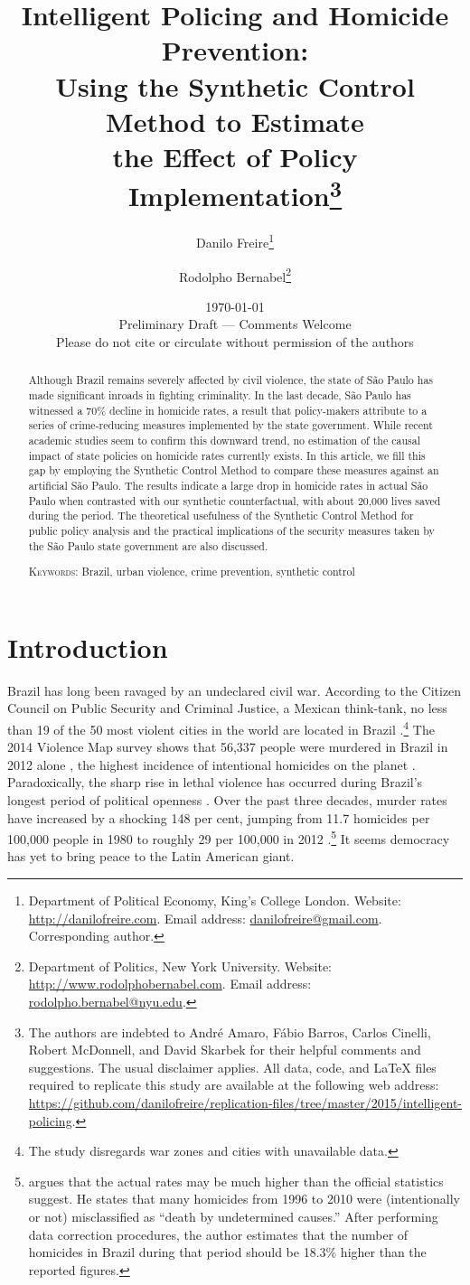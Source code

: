 \documentclass[a4paper,11pt]{article}
\title{Intelligent Policing and Homicide Prevention:\\ Using the Synthetic Control Method to Estimate\\ the Effect of Policy Implementation\thanks{The authors are indebted to Andr\'{e} Amaro, F\'{a}bio Barros, Carlos Cinelli, Robert McDonnell, and David Skarbek for their helpful comments and suggestions. The usual disclaimer applies. All data, code, and \LaTeX \hspace{.001cm} files required to replicate this study are available at the following web address: \href{https://github.com/danilofreire/replication-files/tree/master/2015/intelligent-policing}{https://github.com/danilofreire/replication-files/tree/master/2015/intelligent-policing}.}}
\author{
Danilo Freire\thanks{Department of Political Economy, King's College London. Website: \href{http://danilofreire.com}{http://danilofreire.com}. Email address: \href{mailto:danilofreire@gmail.com}{danilofreire@gmail.com}. Corresponding author.}
\and Rodolpho Bernabel\thanks{Department of Politics, New York University. Website: \href{http://www.rodolphobernabel.com}{http://www.rodolphobernabel.com}. Email address: \href{mailto:rodolpho.bernabel@nyu.edu}{rodolpho.bernabel@nyu.edu}.}
}
\date{\today\\
\vspace{2cm}
Preliminary Draft --- Comments Welcome\\
\vspace{.25cm}
Please do not cite or circulate without permission of the authors
}
\begin{document}
\maketitle

\begin{abstract}

\onehalfspacing

Although Brazil remains severely affected by civil violence, the state of S\~{a}o Paulo has made significant inroads in fighting criminality. In the last decade, S\~{a}o Paulo has witnessed a 70\% decline in homicide rates, a result that policy-makers attribute to a series of crime-reducing measures implemented by the state government. While recent academic studies seem to confirm this downward trend, no estimation of the causal impact of state policies on homicide rates currently exists. In this article, we fill this gap by employing the Synthetic Control Method to compare these measures against an artificial S\~{a}o Paulo. The results indicate a large drop in homicide rates in actual S\~{a}o Paulo when contrasted with our synthetic counterfactual, with about 20,000 lives saved during the period. The theoretical usefulness of the Synthetic Control Method for public policy analysis and the practical implications of the security measures taken by the S\~{a}o Paulo state government are also discussed.

\vspace{.5cm}
\noindent
\textsc{Keywords}: Brazil, urban violence, crime prevention, synthetic control
\end{abstract}

\newpage

\section{Introduction}

\doublespacing

Brazil has long been ravaged by an undeclared civil war. According to the Citizen Council on Public Security and Criminal Justice, a Mexican think-tank, no less than 19 of the 50 most violent cities in the world are located in Brazil \citep{mexico2014}.\footnote{The study disregards war zones and cities with unavailable data.} The 2014 Violence Map survey shows that 56,337 people were murdered in Brazil in 2012 alone \citep{mapa2014}, the highest incidence of intentional homicides on the planet \citep{unodc2013}. Paradoxically, the sharp rise in lethal violence has occurred during Brazil's longest period of political openness \citep{ahnen2003, pinheiro2000, pinheiro2001}. Over the past three decades, murder rates have increased by a shocking 148 per cent, jumping from 11.7 homicides per 100,000 people in 1980 to roughly 29 per 100,000 in 2012 \citep{mapa2014}.\footnote{\citet{cerqueira2013} argues that the actual rates may be much higher than the official statistics suggest. He states that many homicides from 1996 to 2010 were (intentionally or not) misclassified as ``death by undetermined causes.'' After performing data correction procedures, the author estimates that the number of homicides in Brazil during that period should be 18.3\% higher than the reported figures.}  It seems democracy has yet to bring peace to the Latin American giant.
\end{document}

